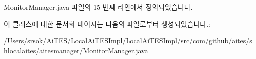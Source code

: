 Monitor\+Manager.\+java 파일의 15 번째 라인에서 정의되었습니다.



이 클래스에 대한 문서화 페이지는 다음의 파일로부터 생성되었습니다.\+:\begin{DoxyCompactItemize}
\item 
/\+Users/srsok/\+Ai\+T\+E\+S/\+Local\+Ai\+T\+E\+S\+Impl/\+Local\+Ai\+T\+E\+S\+Impl/src/com/github/aites/shlocalaites/aitesmanager/\mbox{\hyperlink{_monitor_manager_8java}{Monitor\+Manager.\+java}}\end{DoxyCompactItemize}

